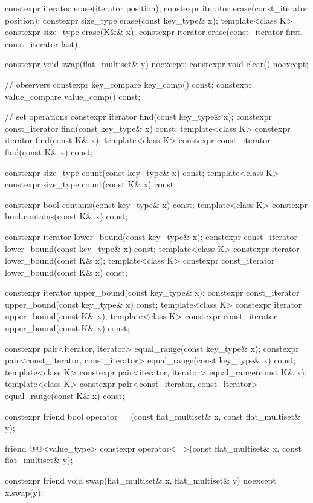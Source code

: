\begin{codeblock}
{{    constexpr iterator erase(iterator position);
    constexpr iterator erase(const_iterator position);
    constexpr size_type erase(const key_type& x);
    template<class K> constexpr size_type erase(K&& x);
    constexpr iterator erase(const_iterator first, const_iterator last);

    constexpr void swap(flat_multiset& y) noexcept;
    constexpr void clear() noexcept;

    // observers
    constexpr key_compare key_comp() const;
    constexpr value_compare value_comp() const;

    // set operations
    constexpr iterator find(const key_type& x);
    constexpr const_iterator find(const key_type& x) const;
    template<class K> constexpr iterator find(const K& x);
    template<class K> constexpr const_iterator find(const K& x) const;

    constexpr size_type count(const key_type& x) const;
    template<class K> constexpr size_type count(const K& x) const;

    constexpr bool contains(const key_type& x) const;
    template<class K> constexpr bool contains(const K& x) const;

    constexpr iterator lower_bound(const key_type& x);
    constexpr const_iterator lower_bound(const key_type& x) const;
    template<class K> constexpr iterator lower_bound(const K& x);
    template<class K> constexpr const_iterator lower_bound(const K& x) const;

    constexpr iterator upper_bound(const key_type& x);
    constexpr const_iterator upper_bound(const key_type& x) const;
    template<class K> constexpr iterator upper_bound(const K& x);
    template<class K> constexpr const_iterator upper_bound(const K& x) const;

    constexpr pair<iterator, iterator> equal_range(const key_type& x);
    constexpr pair<const_iterator, const_iterator> equal_range(const key_type& x) const;
    template<class K>
      constexpr pair<iterator, iterator> equal_range(const K& x);
    template<class K>
      constexpr pair<const_iterator, const_iterator> equal_range(const K& x) const;

    constexpr friend bool operator==(const flat_multiset& x, const flat_multiset& y);

    friend @@<value_type>
      constexpr operator<=>(const flat_multiset& x, const flat_multiset& y);

    constexpr friend void swap(flat_multiset& x, flat_multiset& y) noexcept
      { x.swap(y); }

}}
\end{codeblock}
